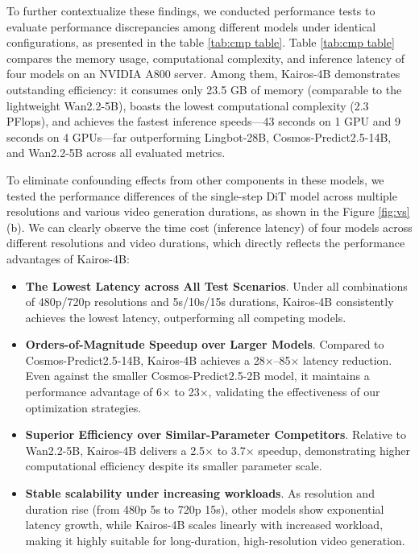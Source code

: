 To further contextualize these findings, we conducted performance tests  to evaluate performance discrepancies among different models under identical configurations, as presented in the table \ref{tab:cmp table}. Table \ref{tab:cmp table} compares the memory usage, computational complexity, and inference latency of four models on an NVIDIA A800 server. Among them, Kairos-4B demonstrates outstanding efficiency: it consumes only 23.5 GB of memory (comparable to the lightweight Wan2.2-5B), boasts the lowest computational complexity (2.3 PFlops), and achieves the fastest inference speeds—43 seconds on 1 GPU and 9 seconds on 4 GPUs—far outperforming Lingbot-28B, Cosmos-Predict2.5-14B, and Wan2.2-5B across all evaluated metrics.


To eliminate confounding effects from other components in these models, we tested the performance differences of the single-step DiT model across multiple resolutions and various video generation durations, as shown in the Figure \ref{fig:vs} (b). We can clearly observe the time cost (inference latency) of four models across different resolutions  and video durations, which directly reflects the performance advantages of Kairos-4B:




\begin{itemize}

    \item \textbf{The Lowest Latency across All Test Scenarios}. Under all combinations of 480p/720p resolutions and 5s/10s/15s durations, Kairos-4B consistently achieves the lowest latency, outperforming all competing models.

    \item \textbf{Orders-of-Magnitude Speedup over Larger Models}. Compared to Cosmos-Predict2.5-14B, Kairos-4B achieves a 28×–85× latency reduction. Even against the smaller Cosmos-Predict2.5-2B model, it maintains a performance advantage of 6× to 23×, validating the effectiveness of our optimization strategies.
    
    \item \textbf{Superior Efficiency over Similar-Parameter Competitors}. Relative to Wan2.2-5B, Kairos-4B delivers a 2.5× to 3.7× speedup, demonstrating higher computational efficiency despite its smaller parameter scale.
    
    \item \textbf{Stable scalability under increasing workloads}. As resolution and duration rise (from 480p 5s to 720p 15s), other models show exponential latency growth, while Kairos-4B scales linearly with increased workload, making it highly suitable for long-duration, high-resolution video generation.    
    
\end{itemize}    



